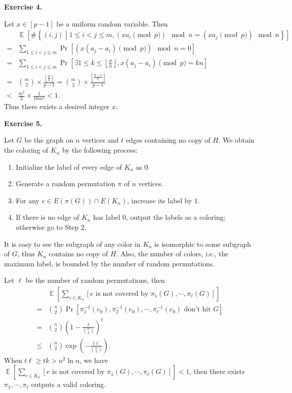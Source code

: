 \documentclass[a4paper]{article}
\newenvironment{exercise}[1]{
	\par
	\noindent\textbf{Exercise #1.}\quad
}{
	\par
	\bigskip
}
\DeclareMathOperator{\E}{\mathbb E}
\newcommand{\pbra}[1]{\left( #1 \right)}
\newcommand{\cbra}[1]{\left\{ #1 \right\}}
\newcommand{\sbra}[1]{\left[ #1 \right]}
\newcommand{\floorbra}[1]{\left\lfloor #1 \right\rfloor}
\begin{document}
\begin{exercise}{4}
    Let $x\in[p-1]$ be a uniform random variable. Then
    \begin{align*}
        &\E\sbra{\#\cbra{(i,j)\middle|1\leq i<j\leq m,(xa_i\pmod p)\mod n=(xa_j\pmod p)\mod n}}\\
        =&\sum_{1\leq i<j\leq m}\Pr\sbra{(x(a_j-a_i)\pmod p)\mod n=0}\\
        =&\sum_{1\leq i<j\leq m}\Pr\sbra{\exists 1\leq k\leq\floorbra{\frac pn},x(a_j-a_i)\pmod p=kn}\\
        =&\binom m2\times\frac{\floorbra{\frac pn}}{p-1}=\binom m2\times\frac{\floorbra{\frac{p-1}n}}{p-1}\\
        <&\frac{m^2}2\times\frac1{10m^2}<1.
    \end{align*}
    Thus there exists a desired integer $x$.
\end{exercise}

\begin{exercise}{5}
    Let $G$ be the graph on $n$ vertices and $t$ edges containing no copy of $H$.
    We obtain the coloring of $K_n$ by the following process:
    \begin{enumerate}
        \item Initialize the label of every edge of $K_n$ as $0$.
        \item Generate a random permutation $\pi$ of $n$ vertices.
        \item For any $e\in E(\pi(G))\cap E(K_n)$, increase its label by $1$.
        \item If there is no edge of $K_n$ has label $0$, output the labels as a coloring;
            otherwise go to Step $2$.
    \end{enumerate}
    It is easy to see the subgraph of any color in $K_n$ is isomorphic to some subgraph of $G$, thus $K_n$ contains
    no copy of $H$. Also, the number of colors, i.e., the maximum label, is bounded by the number of random permutations.

    Let $\ell$ be the number of random permutations, then
    \begin{align*}
        &\E\sbra{\sum_{e\in K_n}\sbra{e\text{ is not covered by $\pi_1(G),\cdots,\pi_\ell(G)$}}}\\
        =&\binom n2\Pr\sbra{\pi_1^{-1}(e_0),\pi_2^{-1}(e_0),\cdots,\pi_\ell^{-1}(e_0)\text{ don't hit $G$}}\\
        =&\binom n2\pbra{1-\frac{t}{\binom n2}}^\ell\\
        \leq&\binom n2\exp\pbra{-\frac{t\ell}{\binom n2}}.
    \end{align*}
    When $t\ell\geq tk>n^2\ln n$, we have 
    $\E\sbra{\sum_{e\in K_n}\sbra{e\text{ is not covered by $\pi_1(G),\cdots,\pi_\ell(G)$}}}<1$,
    then there exists $\pi_1,\cdots,\pi_\ell$ outputs a valid coloring.
\end{exercise}
\end{document}
